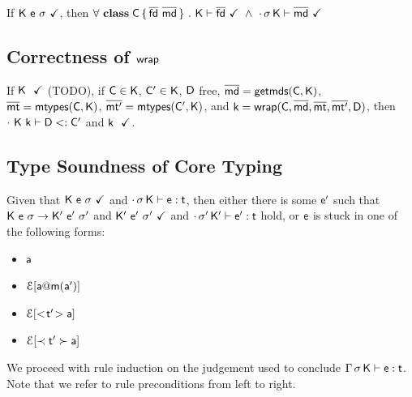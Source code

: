 \documentclass[a4paper,USenglish]{tex/lipics-v2016}
\begin{document}
If $\WFp\K{\e~\s}$, then $\forall~\Class\C{\b{\fd}}{\b\md}~.~\WFtype\K{\b\fd}~\wedge~\WF\cdot\s\K{\b\md}$

\subsection{Correctness of $\xt{wrap}$}

If $\WFp \K$ (TODO), if $\C \in \K$, $\Cp \in \K$, $\D$ free, $\b\md = \getmds\C\K$, $\bmt = \classoff\C\K$, $\bmtp = \classoff\Cp\K$, and $\k = \wrap\C{\b\md}\bmt\bmtp\D$, then $\StrSub\cdot{\K~\k}\D\Cp$ and $\WFp \k$.

\subsection{Type Soundness of Core \kafka Typing}

Given that $\WFp\K{\e~\s}$ and $\EnvType\cdot\s\K\e\t$, then either there is some $\ep$ 
such that $\Reduce \K\e\s \Kp\ep\sp$ and $\WFp\Kp{\ep~\sp}$ and $\EnvType\cdot\sp\Kp\ep\t$ hold, 
or $\e$ is stuck in one of the following forms:
\begin{itemize} 
\item $\a$
\item $\EE[\DynCall\a\m{\ap}]$
\item $\EE[\SubCast\tp\a]$
\item $\EE[\ShaCast\tp\a]$
\end{itemize}

We proceed with rule induction on the judgement used to conclude $\EnvType\Env\s\K\e\t$. 
Note that we refer to rule preconditions from left to right.
\end{document}
